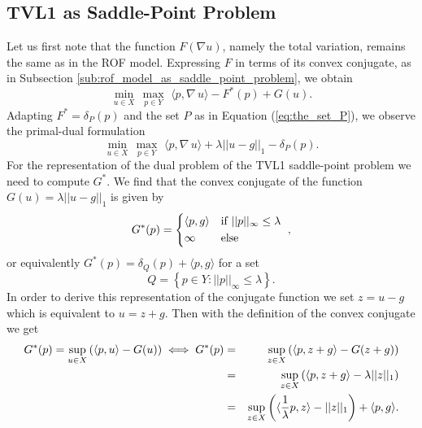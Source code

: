 \documentclass[abstracton]{scrreprt}
\begin{document}
        \subsection{TVL1 as Saddle-Point Problem} %
        \label{sub:tvl1_as_saddle_point_problem}

            Let us first note that the function $F(\nabla u)$, namely the total variation, remains the same as in the ROF model. Expressing $F$ in terms of its convex conjugate, as in Subsection \ref{sub:rof_model_as_saddle_point_problem}, we obtain
                $$
                    \min_{u \in X}\, \max_{p \in Y}\,\, \langle p, \nabla \, u \rangle - F^{\ast}(p) + G(u).
                $$
            Adapting $F^{\ast} = \delta_{P}(p)$ and the set $P$ as in Equation (\ref{eq:the_set_P}), we observe the primal-dual formulation
                $$
                    \min_{u \in X}\, \max_{p \in Y}\,\, \langle p, \nabla\, u \rangle + \lambda ||u - g||_{1} - \delta_{P}(p).
                $$
            For the representation of the dual problem of the TVL1 saddle-point problem we need to compute $G^{\ast}$. We find that the convex conjugate of the function  $G(u) = \lambda||u-g||_{1}$ is given by
                $$
                    G^{\ast}(p) =
                        \begin{dcases*}
                            \langle p, g \rangle & \textnormal{if $||p||_{\infty} \le \lambda$} \\
                            \infty & \textnormal{else}
                        \end{dcases*},
                $$
            or equivalently $G^{\ast}(p) = \delta_{Q}(p) + \langle p, g \rangle$ for a set
                $$
                    Q = \left\{ p \in Y : ||p||_{\infty} \le \lambda \right\}.
                $$
            In order to derive this representation of the conjugate function we set $z = u - g$ which is equivalent to $u = z + g$. Then with the definition of the convex conjugate we get
                \begin{eqnarray}
                    G^{\ast}(p) = \sup_{u \in X} \left( \langle p, u \rangle - G(u) \right) \iff G^{\ast}(p) &=& \sup_{z \in X} \left( \langle p, z + g \rangle - G(z + g) \right) \notag \\
                    &=& \sup_{z \in X} \left( \langle p, z + g \rangle - \lambda ||z||_{1} \right) \notag \\
                    &=& \sup_{z \in X} \left( \langle \frac{1}{\lambda} p, z \rangle - ||z||_{1} \right) + \langle p, g \rangle. \notag
                \end{eqnarray}
\end{document}
